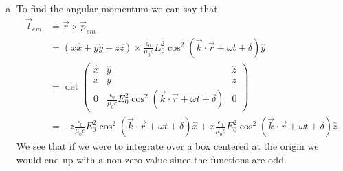 \documentclass[11pt]{article}
\numberwithin{equation}{section}
\begin{document}
\begin{enumerate}[(a)]
\item
To find the angular momentum we can say that
\begin{align*}
\vec{l}_{em} &= \vec{r}\times\vec{p}_{em}\\
&= (x\hat{x}+y\hat{y}+z\hat{z})\times\frac{\epsilon_0}{\mu_0c}E_0^2\cos^2(\vec{k}\cdot\vec{r}+\omega t+\delta)\hat{y}\\
&= \det\left(\begin{array}{ccc}
\hat{x}		&\hat{y}	&\hat{z}\\	
x		&y		&z	\\
0		&\frac{\epsilon_0}{\mu_0c}E_0^2\cos^2(\vec{k}\cdot\vec{r}+\omega t+\delta)	&0
\end{array}\right)\\
&= -z\frac{\epsilon_0}{\mu_0c}E_0^2\cos^2(\vec{k}\cdot\vec{r}+\omega t+\delta)\hat{x} + x\frac{\epsilon_0}{\mu_0c}E_0^2\cos^2(\vec{k}\cdot\vec{r}+\omega t+\delta)\hat{z}
\end{align*}
We see that if we were to integrate over a box centered at the origin we would end up with a non-zero value since the functions are odd.

\end{enumerate}
\end{document}
